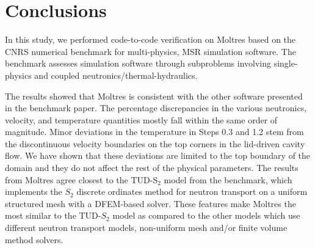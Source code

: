 \section{Conclusions}

In this study, we performed code-to-code verification on Moltres based on the
CNRS numerical benchmark \citep{tiberga_results_2020} for multi-physics,
\gls{MSR} simulation software. The benchmark assesses simulation
software through subproblems involving single-physics and coupled
neutronics/thermal-hydraulics.

The results showed that Moltres is consistent with the other software
presented in the benchmark paper. The percentage discrepancies in the various
neutronics, velocity, and temperature quantities mostly fall within the same
order of magnitude. Minor deviations in the temperature in Steps 0.3 and 1.2 
stem from the discontinuous velocity
boundaries on the top corners in the lid-driven cavity flow. We have shown that
these deviations are limited to the top boundary of the domain and they do not
affect the rest of the physical parameters. The results from
Moltres agree closest to the TUD-S$_2$ model
from the benchmark, which implements the $S_2$ discrete ordinates method for
neutron transport on a uniform structured mesh with a \gls{DFEM}-based solver.
These features make Moltres the most similar to the TUD-$S_2$ model as compared
to the other models which use different neutron transport models, non-uniform
mesh and/or finite volume method solvers.
